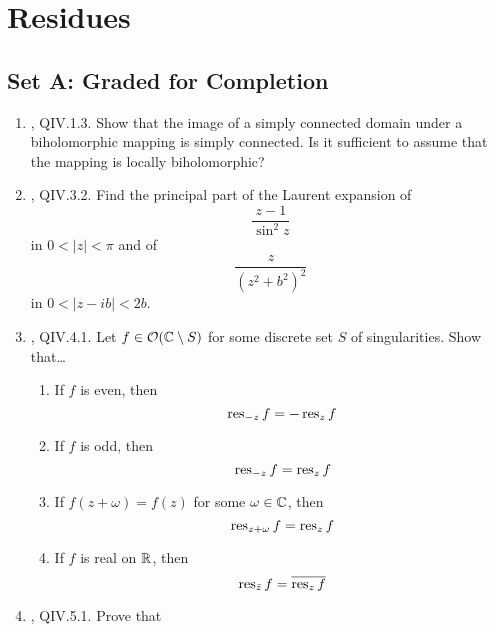 \documentclass[../psets.tex]{subfiles}
\begin{document}
\section{Residues}
\subsection*{Set A: Graded for Completion}
\begin{enumerate}[ref={A.\arabic*}]
    \item {}\textcite{bib:FischerLieb}, QIV.1.3. Show that the image of a simply connected domain under a biholomorphic mapping is simply connected. Is it sufficient to assume that the mapping is locally biholomorphic?
    \item \textcite{bib:FischerLieb}, QIV.3.2. Find the principal part of the Laurent expansion of
    \begin{equation*}
        \frac{z-1}{\sin^2z}
    \end{equation*}
    in $0<|z|<\pi$ and of
    \begin{equation*}
        \frac{z}{(z^2+b^2)^2}
    \end{equation*}
    in $0<|z-ib|<2b$.
    \item \textcite{bib:FischerLieb}, QIV.4.1. Let $f\in\mathcal{O}(\mathbb{C}\setminus S)$ for some discrete set $S$ of singularities. Show that\dots
    \begin{enumerate}
        \item If $f$ is even, then
        \begin{equation*}
            \operatorname{res}_{-z}f = -\operatorname{res}_zf
        \end{equation*}
        \item If $f$ is odd, then
        \begin{equation*}
            \operatorname{res}_{-z}f = \operatorname{res}_zf
        \end{equation*}
        \item If $f(z+\omega)=f(z)$ for some $\omega\in\mathbb{C}$, then
        \begin{equation*}
            \operatorname{res}_{z+\omega}f=\operatorname{res}_zf
        \end{equation*}
        \item If $f$ is real on $\mathbb{R}$, then
        \begin{equation*}
            \operatorname{res}_{\bar{z}}f = \overline{\operatorname{res}_zf}
        \end{equation*}
    \end{enumerate}
    \item \textcite{bib:FischerLieb}, QIV.5.1. Prove that

\end{enumerate}
\end{document}
